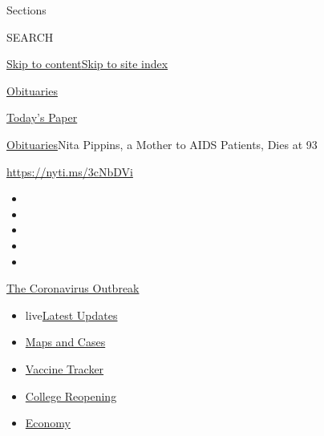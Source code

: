 Sections

SEARCH

\protect\hyperlink{site-content}{Skip to
content}\protect\hyperlink{site-index}{Skip to site index}

\href{https://www.nytimes.com/section/obituaries}{Obituaries}

\href{https://myaccount.nytimes.com/auth/login?response_type=cookie\&client_id=vi}{}

\href{https://www.nytimes.com/section/todayspaper}{Today's Paper}

\href{/section/obituaries}{Obituaries}\textbar{}Nita Pippins, a Mother
to AIDS Patients, Dies at 93

\url{https://nyti.ms/3cNbDVi}

\begin{itemize}
\item
\item
\item
\item
\item
\end{itemize}

\href{https://www.nytimes.com/news-event/coronavirus?action=click\&pgtype=Article\&state=default\&region=TOP_BANNER\&context=storylines_menu}{The
Coronavirus Outbreak}

\begin{itemize}
\tightlist
\item
  live\href{https://www.nytimes.com/2020/08/03/world/coronavirus-covid-19.html?action=click\&pgtype=Article\&state=default\&region=TOP_BANNER\&context=storylines_menu}{Latest
  Updates}
\item
  \href{https://www.nytimes.com/interactive/2020/us/coronavirus-us-cases.html?action=click\&pgtype=Article\&state=default\&region=TOP_BANNER\&context=storylines_menu}{Maps
  and Cases}
\item
  \href{https://www.nytimes.com/interactive/2020/science/coronavirus-vaccine-tracker.html?action=click\&pgtype=Article\&state=default\&region=TOP_BANNER\&context=storylines_menu}{Vaccine
  Tracker}
\item
  \href{https://www.nytimes.com/2020/08/02/us/covid-college-reopening.html?action=click\&pgtype=Article\&state=default\&region=TOP_BANNER\&context=storylines_menu}{College
  Reopening}
\item
  \href{https://www.nytimes.com/live/2020/08/03/business/stock-market-today-coronavirus?action=click\&pgtype=Article\&state=default\&region=TOP_BANNER\&context=storylines_menu}{Economy}
\end{itemize}


